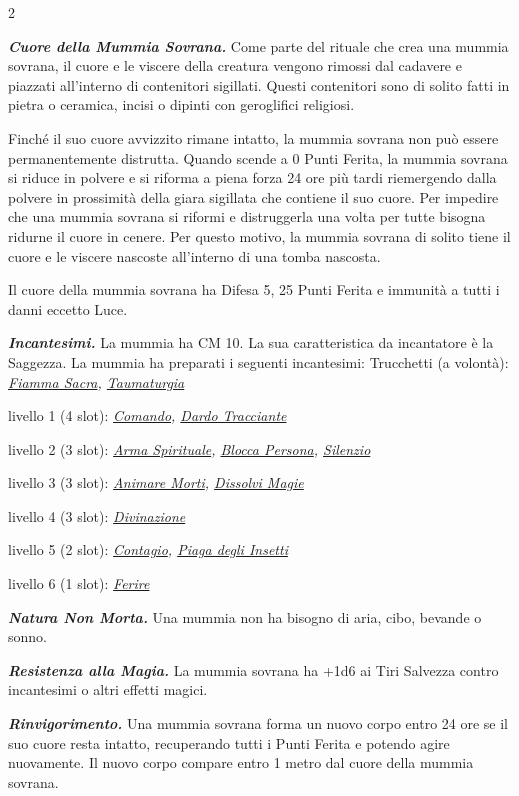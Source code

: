 \begin{multicols}{2}
{\emph{\textbf{Cuore della Mummia Sovrana.}} Come parte del rituale che crea una mummia sovrana, il cuore e le viscere della creatura vengono rimossi dal cadavere e piazzati all'interno di contenitori sigillati. Questi contenitori sono di solito fatti in pietra o ceramica, incisi o dipinti con geroglifici religiosi.

Finché il suo cuore avvizzito rimane intatto, la mummia sovrana non può essere permanentemente distrutta. Quando scende a 0 Punti Ferita, la mummia sovrana si riduce in polvere e si riforma a piena forza 24 ore più tardi riemergendo dalla polvere in prossimità della giara sigillata che contiene il suo cuore. Per impedire che una mummia sovrana si riformi e distruggerla una volta per tutte bisogna ridurne il cuore in cenere. Per questo motivo, la mummia sovrana di solito tiene il cuore e le viscere nascoste all'interno di una tomba nascosta.

Il cuore della mummia sovrana ha Difesa 5, 25 Punti Ferita e immunità a tutti i danni eccetto Luce.

\emph{\textbf{Incantesimi.}} La mummia ha CM 10. La sua caratteristica da incantatore è la Saggezza. La mummia ha preparati i seguenti incantesimi: Trucchetti (a volontà): \emph{\hyperlink{Fiamma Sacra}{Fiamma Sacra}, \hyperlink{Taumaturgia}{Taumaturgia}}

livello 1 (4 slot): \emph{\hyperlink{Comando}{Comando}, \hyperlink{Dardo Tracciante}{Dardo Tracciante}}

livello 2 (3 slot): \emph{\hyperlink{Arma Spirituale}{Arma Spirituale}, \hyperlink{Blocca Persona}{Blocca Persona}, \hyperlink{Silenzio}{Silenzio}}

livello 3 (3 slot): \emph{\hyperlink{Animare Morti}{Animare Morti}, \hyperlink{Dissolvi Magie}{Dissolvi Magie}}

livello 4 (3 slot): \emph{\hyperlink{Divinazione}{Divinazione}}

livello 5 (2 slot): \emph{\hyperlink{Contagio}{Contagio}, \hyperlink{Piaga degli Insetti}{Piaga degli Insetti}}

livello 6 (1 slot): \emph{\hyperlink{Ferire}{Ferire}}

\emph{\textbf{Natura Non Morta.}} Una mummia non ha bisogno di aria, cibo, bevande o sonno.

\emph{\textbf{Resistenza alla Magia.}} La mummia sovrana ha +1d6 ai Tiri Salvezza contro incantesimi o altri effetti magici.

\emph{\textbf{Rinvigorimento.}} Una mummia sovrana forma un nuovo corpo entro 24 ore se il suo cuore resta intatto, recuperando tutti i Punti Ferita e potendo agire nuovamente. Il nuovo corpo compare entro 1 metro dal cuore della mummia sovrana.

}
\end{multicols}
